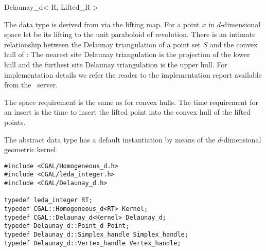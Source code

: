 \begin{ccRefClass}{Delaunay_d< R, Lifted_R >}






\ccImplementation

The data type is derived from  via
the lifting map. For a point $x$ in $d$-dimensional space let
 be its lifting to the unit paraboloid of revolution. There
is an intimate relationship between the Delaunay triangulation of a
point set $S$ and the convex hull of : The nearest site
Delaunay triangulation is the projection of the lower hull and the
furthest site Delaunay triangulation is the upper hull.  For
implementation details we refer the reader to the implementation
report available from the \cgal\ server.

The space requirement is the same as for convex hulls. The time
requirement for an insert is the time to insert the lifted point
into the convex hull of the lifted points. 



\ccExample



The abstract data type  has a default instantiation by
means of the $d$-dimensional geometric kernel.

\begin{verbatim}
#include <CGAL/Homogeneous_d.h>
#include <CGAL/leda_integer.h>
#include <CGAL/Delaunay_d.h>

typedef leda_integer RT;
typedef CGAL::Homogeneous_d<RT> Kernel;
typedef CGAL::Delaunay_d<Kernel> Delaunay_d;
typedef Delaunay_d::Point_d Point;
typedef Delaunay_d::Simplex_handle Simplex_handle;
typedef Delaunay_d::Vertex_handle Vertex_handle;


\end{verbatim}
\end{ccRefClass}
